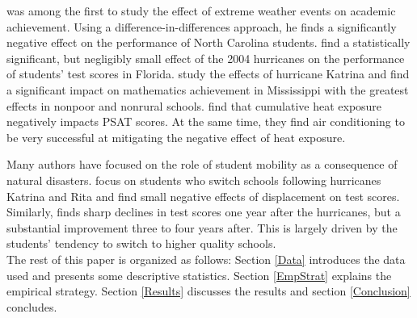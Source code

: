 \cite{Holmes_2002} was among the first to study the effect of extreme weather events on academic achievement. Using a difference-in-differences approach, he finds a significantly negative effect on the performance of North Carolina students. \cite{Baggerly_2008} find a statistically significant, but negligibly small effect of the 2004 hurricanes on the performance of students' test scores in Florida. \cite{Lamb_2013} study the effects of hurricane Katrina and find a significant impact on mathematics achievement in Mississippi with the greatest effects in nonpoor and nonrural schools. \cite{Goodman_2020} find that cumulative heat exposure negatively impacts PSAT scores. At the same time, they find air conditioning to be very successful at mitigating the negative effect of heat exposure.

Many authors have focused on the role of student mobility as a consequence of natural disasters. \cite{Pane_2008} focus on students who switch schools following hurricanes Katrina and Rita and find small negative effects of displacement on test scores. Similarly, \cite{Sacerdote_2012} finds sharp declines in test scores one year after the hurricanes, but a substantial improvement three to four years after. This is largely driven by the students' tendency to switch to higher quality schools.
\\

The rest of this paper is organized as follows: Section \ref{Data} introduces the data used and presents some descriptive statistics. Section \ref{EmpStrat} explains the empirical strategy. Section \ref{Results} discusses the results and section \ref{Conclusion} concludes.


